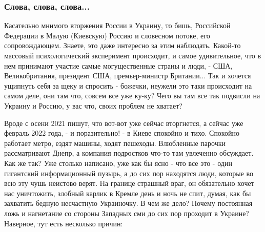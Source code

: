  
 
 
 
 
\clearpage
\subsubsection{Слова, слова, слова...}

Касательно мнимого вторжения России в Украину, то бишь, Российской Федерации в
Малую (Киевскую) Россию и словесном потоке, его сопровождающем.  Знаете, это
даже интересно за этим наблюдать. Какой-то массовый психологический эксперимент
происходит, и самое удивительное, что в нем принимают участие самые
могущественные страны и люди, - США, Великобритания, президент США,
премьер-министр Британии... Так и хочется ущипнуть себя за щеку и спросить -
божечки, неужели это таки происходит на самом деле, они там что, совсем все уже
ку-ку? Чего вы там все так подвисли на Украину и Россию, у вас что, своих
проблем не хватает?

Вроде с осени 2021 пишут, что вот-вот уже сейчас вторгнется, а сейчас уже
февраль 2022 года, - и поразительно! - в Киеве спокойно и тихо. Спокойно
работает метро, ездят машины, ходят пешеходы. Влюбленные парочки рассматривают
Днепр, а компания подростков что-то там увлеченно обсуждает.  Как же так? Уже
столько написано, уже как бы ясно - что все это - один гигантский
информационный пузырь, а до сих пор находятся люди, которые во всю эту чушь
неистово верят. На границе страшный враг, он обязательно хочет нас уничтожить,
злобный карлик в Кремле день и ночь не спит, думая, как бы захватить бедную
несчастную Украиночку. В чем же дело?  Почему постоянная ложь и нагнетание со
стороны Западных сми до сих пор проходит в Украине? Наверное, тут есть
несколько причин:

